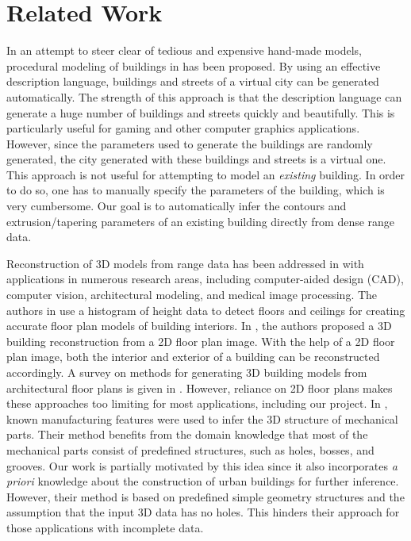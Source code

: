\section{Related Work}

In an attempt to steer clear of tedious and expensive hand-made models,
procedural modeling of buildings in \cite{PMB_MWH,PMB_WWS,PMB_PM} has been proposed.
By using an effective description language, buildings and streets of a virtual
city can be generated automatically.
The strength of this approach is that the description language can generate
a huge number of buildings and streets quickly and beautifully.
This is particularly useful for gaming and other computer graphics applications.
However, since the parameters used to generate the buildings are randomly
generated, the city generated with these buildings and streets is a virtual one.
This approach is not useful for attempting to model an {\it existing} building.
In order to do so, one has to manually specify the parameters of the building,
which is very cumbersome.
Our goal is to automatically infer the contours and extrusion/tapering parameters
of an existing building directly from dense range data.

Reconstruction of 3D models from range data has been addressed in
\cite{RE_Fisher,RE_CLF,RE_CD} with applications in numerous research areas,
including computer-aided design (CAD), computer vision, architectural modeling,
and medical image processing.
The authors in \cite{Okorn10} use a histogram of height data to detect floors
and ceilings for creating accurate floor plan models of building interiors.
In \cite{DP_OWYC}, the authors proposed a 3D building reconstruction from a
2D floor plan image.
With the help of a 2D floor plan image, both the interior and exterior of a
building can be reconstructed accordingly.
A survey on methods for generating 3D building models from architectural
floor plans is given in \cite{YIN09}.
However, reliance on 2D floor plans makes these approaches too limiting for
most applications, including our project.
In \cite{RE_TOGSH}, known manufacturing features were used to infer the
3D structure of mechanical parts.
Their method benefits from the domain knowledge that most of the mechanical
parts consist of predefined structures, such as holes, bosses, and grooves.
Our work is partially motivated by this idea since it also incorporates
{\it a priori} knowledge about the construction of urban buildings for further
inference.
However, their method is based on predefined simple geometry structures and
the assumption that the input 3D data has no holes.
This hinders their approach for those applications with incomplete data.

